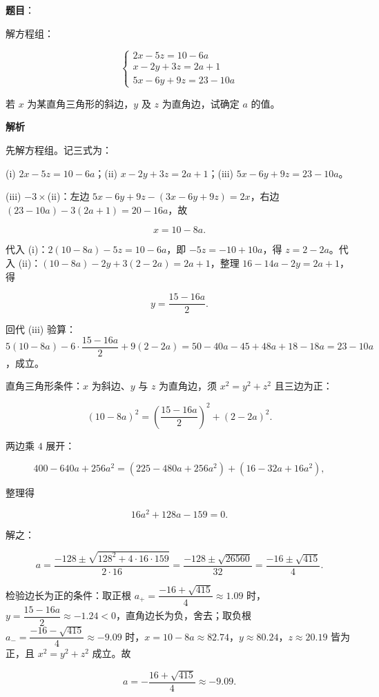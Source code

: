 \begin{answer}

\textbf{题目}：

解方程组：

\nopagebreak[4]
\[
\begin{cases}
2x-5z=10-6a\\
x-2y+3z=2a+1\\
5x-6y+9z=23-10a
\end{cases}
\]

若 $x$ 为某直角三角形的斜边，$y$ 及 $z$ 为直角边，试确定 $a$ 的值。

\textbf{解析}

先解方程组。记三式为：

(i) $2x-5z=10-6a$；(ii) $x-2y+3z=2a+1$；(iii) $5x-6y+9z=23-10a$。

(iii) $-3\times$(ii)：左边 $5x-6y+9z-(3x-6y+9z)=2x$，右边 $(23-10a)-3(2a+1)=20-16a$，故

\nopagebreak[4]
\[
x=10-8a.
\]

代入 (i)：$2(10-8a)-5z=10-6a$，即 $-5z=-10+10a$，得 $z=2-2a$。代入 (ii)：$(10-8a)-2y+3(2-2a)=2a+1$，整理 $16-14a-2y=2a+1$，得

\nopagebreak[4]
\[
y=\frac{15-16a}{2}.
\]

回代 (iii) 验算：$5(10-8a)-6\cdot\dfrac{15-16a}{2}+9(2-2a)=50-40a-45+48a+18-18a=23-10a$，成立。

直角三角形条件：$x$ 为斜边、$y$ 与 $z$ 为直角边，须 $x^{2}=y^{2}+z^{2}$ 且三边为正：

\nopagebreak[4]
\[
(10-8a)^{2}=\left(\frac{15-16a}{2}\right)^{2}+(2-2a)^{2}.
\]

两边乘 $4$ 展开：

\nopagebreak[4]
\[
400-640a+256a^{2}=(225-480a+256a^{2})+(16-32a+16a^{2}),
\]

整理得

\nopagebreak[4]
\[
16a^{2}+128a-159=0.
\]

解之：

\nopagebreak[4]
\[
a=\frac{-128\pm\sqrt{128^{2}+4\cdot16\cdot159}}{2\cdot16}
=\frac{-128\pm\sqrt{26560}}{32}
=\frac{-16\pm\sqrt{415}}{4}.
\]

检验边长为正的条件：取正根 $a_{+}=\dfrac{-16+\sqrt{415}}{4}\approx1.09$ 时，$y=\dfrac{15-16a}{2}\approx-1.24<0$，直角边长为负，舍去；取负根 $a_{-}=\dfrac{-16-\sqrt{415}}{4}\approx-9.09$ 时，$x=10-8a\approx82.74$，$y\approx80.24$，$z\approx20.19$ 皆为正，且 $x^{2}=y^{2}+z^{2}$ 成立。故

\nopagebreak[4]
\[
a=-\frac{16+\sqrt{415}}{4}\approx-9.09.
\]


\end{answer}
